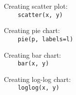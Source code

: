 Creating scatter plot:\\
{\ex \lstinline|    scatter(x, y)|}

Creating pie chart:\\
{\ex \lstinline|    pie(p, labels=l)|}

Creating bar chart:\\
{\ex \lstinline|    bar(x, y)|}

Creating log-log chart:\\
{\ex \lstinline|    loglog(x, y)|}
